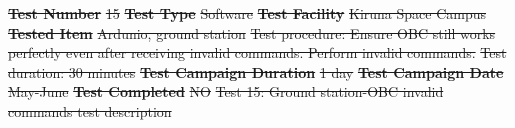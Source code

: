 \documentclass[a4paper,12pt,twoside, final]{article}
\providecommand{\DIFdeltex}[1]{{\protect\color{red}\sout{#1}}}                      %
\providecommand{\DIFdelend}{} %
\providecommand{\DIFdelFL}[1]{\DIFdel{#1}} %
\providecommand{\DIFdel}[1]{\texorpdfstring{\DIFdeltex{#1}}{}} %
\DeclareRobustCommand{\DIFdelend}{\DIFOaddend \let\includegraphics\DIFOincludegraphics} %
\begin{document}
\textbf{\DIFdelFL{Test Number}} %
\DIFdelFL{15 }%
\textbf{\DIFdelFL{Test Type}} %
\DIFdelFL{Software }%
\textbf{\DIFdelFL{Test Facility}} %
\DIFdelFL{Kiruna Space Campus }%
\textbf{\DIFdelFL{Tested Item}} %
\DIFdelFL{Ardunio, ground station }%
\DIFdelFL{Test procedure: Ensure OBC still works perfectly even after receiving invalid commands. Perform invalid commands.}%
\DIFdelFL{Test duration: 30 minutes}%
\textbf{\DIFdelFL{Test Campaign Duration}} %
\DIFdelFL{1 day }%
\textbf{\DIFdelFL{Test Campaign Date}} %
\DIFdelFL{May-June }%
\textbf{\DIFdelFL{Test Completed}} %
\DIFdelFL{NO }%
{%
\DIFdelFL{Test 15: Ground station-OBC invalid commands test description}}

\DIFdelend %
\renewcommand\thempfootnote{\arabic{mpfootnote}}
\end{document}
